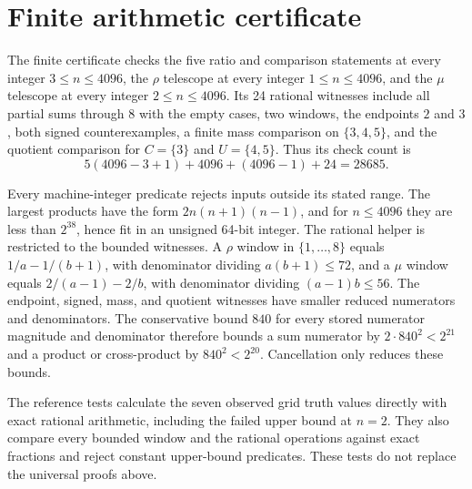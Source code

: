 \documentclass[11pt,letterpaper]{article}
\begin{document}
\section{Finite arithmetic certificate}

The finite certificate checks the five ratio and comparison statements at every integer $3\le n\le4096$, the $\rho$ telescope at every integer $1\le n\le4096$, and the $\mu$ telescope at every integer $2\le n\le4096$. Its 24 rational witnesses include all partial sums through $8$ with the empty cases, two windows, the endpoints $2$ and $3$, both signed counterexamples, a finite mass comparison on $\{3,4,5\}$, and the quotient comparison for $C=\{3\}$ and $U=\{4,5\}$. Thus its check count is
\begin{equation*}
5(4096-3+1)+4096+(4096-1)+24=28685.
\end{equation*}

Every machine-integer predicate rejects inputs outside its stated range. The largest products have the form $2n(n+1)(n-1)$, and for $n\le4096$ they are less than $2^{38}$, hence fit in an unsigned 64-bit integer. The rational helper is restricted to the bounded witnesses. A $\rho$ window in $\{1,\ldots,8\}$ equals $1/a-1/(b+1)$, with denominator dividing $a(b+1)\le72$, and a $\mu$ window equals $2/(a-1)-2/b$, with denominator dividing $(a-1)b\le56$. The endpoint, signed, mass, and quotient witnesses have smaller reduced numerators and denominators. The conservative bound $840$ for every stored numerator magnitude and denominator therefore bounds a sum numerator by $2\cdot840^2<2^{21}$ and a product or cross-product by $840^2<2^{20}$. Cancellation only reduces these bounds.

The reference tests calculate the seven observed grid truth values directly with exact rational arithmetic, including the failed upper bound at $n=2$. They also compare every bounded window and the rational operations against exact fractions and reject constant upper-bound predicates. These tests do not replace the universal proofs above.
\end{document}
